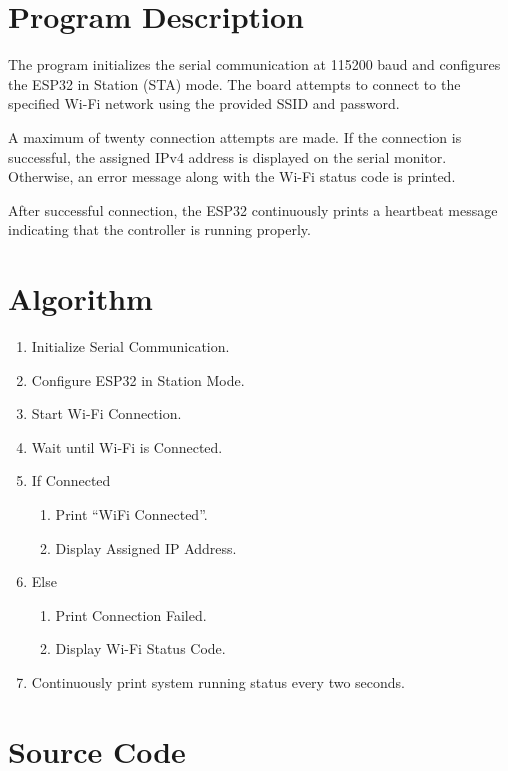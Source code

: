 \documentclass[12pt]{article}
\begin{document}
\section{Program Description}

The program initializes the serial communication at 115200 baud and configures the ESP32 in Station (STA) mode. The board attempts to connect to the specified Wi-Fi network using the provided SSID and password.

A maximum of twenty connection attempts are made. If the connection is successful, the assigned IPv4 address is displayed on the serial monitor. Otherwise, an error message along with the Wi-Fi status code is printed.

After successful connection, the ESP32 continuously prints a heartbeat message indicating that the controller is running properly.

\section{Algorithm}

\begin{enumerate}
    \item Initialize Serial Communication.
    \item Configure ESP32 in Station Mode.
    \item Start Wi-Fi Connection.
    \item Wait until Wi-Fi is Connected.
    \item If Connected
    \begin{enumerate}
        \item Print ``WiFi Connected''.
        \item Display Assigned IP Address.
    \end{enumerate}
    \item Else
    \begin{enumerate}
        \item Print Connection Failed.
        \item Display Wi-Fi Status Code.
    \end{enumerate}
    \item Continuously print system running status every two seconds.
\end{enumerate}

\section{Source Code}
\end{document}
